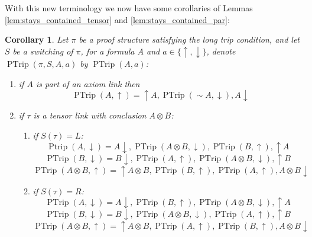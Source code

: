\documentclass[12pt]{article}
\theoremstyle{plain}
\newtheorem{cor}[thm]{Corollary}
\theoremstyle{definition}
\newcommand{\negation}{\sim}
\begin{document}
	With this new terminology we now have some corollaries of Lemmas \ref{lem:stays_contained_tensor} and \ref{lem:stays_contained_par}:
	\begin{cor}\label{cor:pretrip_innards}
		Let $\pi$ be a proof structure satisfying the long trip condition, and let $S$ be a switching of $\pi$, for a formula $A$ and $a \in \lbrace \uparrow, \downarrow\rbrace$, denote $\operatorname{PTrip}(\pi,S, A, a)$ by $\operatorname{PTrip}(A,a)$:
		\begin{enumerate}
			\item if $A$ is part of an axiom link then
			\begin{equation}
				\operatorname{PTrip}(A,\uparrow) = \uparrow A, \operatorname{PTrip}(\negation A, \downarrow), A \downarrow
			\end{equation}
			\item if $\tau$ is a tensor link with conclusion $A \otimes B$:
			\begin{enumerate}
				\item if $S(\tau) = L$:
				\begin{equation}
					\operatorname{Ptrip}(A, \downarrow) = A\downarrow, \operatorname{PTrip}(A \otimes B, \downarrow), \operatorname{PTrip}(B, \uparrow), \uparrow A
				\end{equation}
				\begin{equation}
					\operatorname{PTrip}(B, \downarrow) = B\downarrow, \operatorname{PTrip}(A,\uparrow), \operatorname{PTrip}(A \otimes B, \downarrow), \uparrow B
				\end{equation}
				\begin{equation}
					\operatorname{PTrip}(A \otimes B, \uparrow) = \uparrow A \otimes B, \operatorname{PTrip}(B, \uparrow), \operatorname{PTrip}(A,\uparrow), A \otimes B \downarrow
				\end{equation}
				\item if $S(\tau) = R$:
				\begin{equation}
					\operatorname{PTrip}(A, \downarrow) = A\downarrow, \operatorname{PTrip}(B, \uparrow),\operatorname{PTrip}(A \otimes B, \downarrow), \uparrow A
				\end{equation}
				\begin{equation}
					\operatorname{PTrip}(B, \downarrow) = B\downarrow,  \operatorname{PTrip}(A \otimes B, \downarrow), \operatorname{PTrip}(A,\uparrow),\uparrow B
				\end{equation}
				\begin{equation}
					\operatorname{PTrip}(A \otimes B, \uparrow) = \uparrow A \otimes B,  \operatorname{PTrip}(A,\uparrow), \operatorname{PTrip}(B, \uparrow),A \otimes B \downarrow

\end{equation}
\end{enumerate}
\end{enumerate}
\end{cor}
\end{document}
